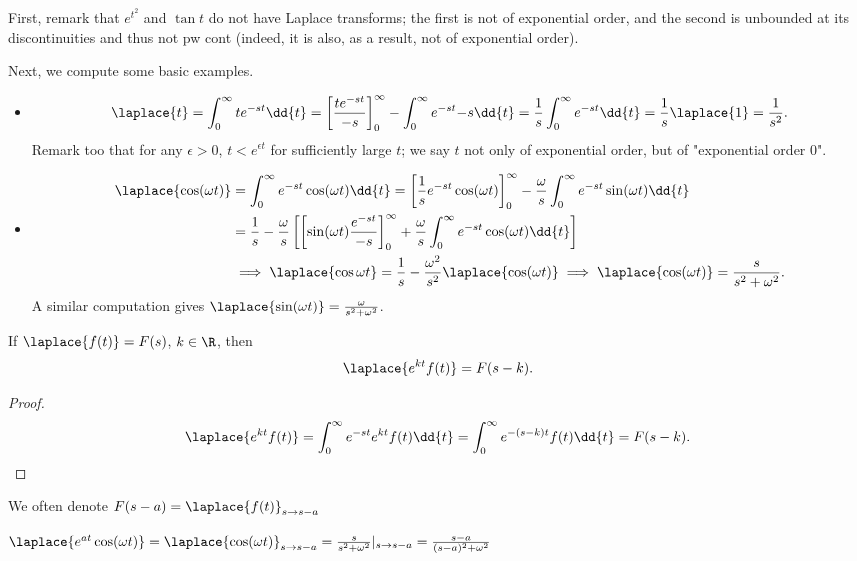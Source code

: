 \begin{example}
    First, remark that $e^{t^2}$ and $\tan t$ do not have Laplace transforms; the first is not of exponential order, and the second is unbounded at its discontinuities and thus not pw cont (indeed, it is also, as a result, not of exponential order).

    Next, we compute some basic examples.
    \begin{itemize}
        \item $$\laplace{t} = \int_0^\infty te^{-st} \dd{t} = \left[\frac{te^{-st}}{-s}\right]_0^\infty - \int_0^\infty e^{-st}{-s} \dd{t} = \frac{1}{s} \int_0^\infty e^{-st} \dd{t} = \frac{1}{s} \laplace{1} = \frac{1}{s^2}.$$ Remark too that for any $\epsilon > 0$, $t < e^{\epsilon t}$ for sufficiently large $t$; we say $t$ not only of exponential order, but of "exponential order 0".
        \item \begin{align*}
            \laplace{\cos(\omega t)} &= \int_{0}^\infty e^{-st} \cos(\omega t) \dd{t} = \left[\frac{1}{s}e^{-st} \cos (\omega t)\right]_0^\infty - \frac{\omega}{s} \int_0^\infty e^{-st} \sin(\omega t) \dd{t}\\
            &= \frac{1}{s} - \frac{\omega}{s} \left[\left[\sin(\omega t) \frac{e^{-st}}{-s}\right]_0^\infty  + \frac{\omega}{s} \int_0^\infty e^{-st} \cos (\omega t) \dd{t}\right]\\
            &\implies \laplace{\cos \omega t} = \frac{1}{s} - \frac{\omega^2}{s^2} \laplace{\cos (\omega t)} \implies \laplace{\cos (\omega t)} = \frac{s}{s^2 + \omega^2}.
        \end{align*}
        A similar computation gives $\laplace{\sin (\omega t)} = \frac{\omega}{s^2 + \omega^2}$.
    \end{itemize}
\end{example}

\begin{theorem}
    If $\laplace{f(t)} = F(s)$, $k \in \R$, then \[
    \laplace{e^{kt} f(t)}     = F(s - k).
    \]
\end{theorem}
\begin{proof}
    \[\laplace{e^{kt} f(t)} = \int_0^\infty e^{-st} e^{kt} f(t) \dd{t} = \int_0^\infty e^{-(s-k)t} f(t) \dd{t} = F(s - k).\]
\end{proof}

\begin{remark}
    We often denote $F(s - a) = \laplace{f(t)}_{s \to s - a}$
\end{remark}
\begin{example}
    $\laplace{e^{at} \cos (\omega t)} = \laplace{\cos(\omega t)}_{s \to s - a} = \frac{s}{s^2 + \omega^2}\vert_{s \to s - a} = \frac{s - a}{(s-a)^2 + \omega^2}$
\end{example}

